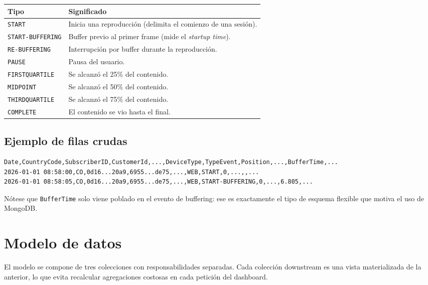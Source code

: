 \documentclass[12pt, letterpaper]{article}
\newcommand{\code}[1]{\texttt{#1}}
\begin{document}
\begin{center}
\begin{tabular}{@{}lL{8.5cm}@{}}
\toprule
\textbf{Tipo} & \textbf{Significado} \\
\midrule
\code{START} & Inicia una reproducción (delimita el comienzo de una sesión). \\
\code{START-BUFFERING} & Buffer previo al primer frame (mide el \emph{startup time}). \\
\code{RE-BUFFERING} & Interrupción por buffer durante la reproducción. \\
\code{PAUSE} & Pausa del usuario. \\
\code{FIRSTQUARTILE} & Se alcanzó el 25\% del contenido. \\
\code{MIDPOINT} & Se alcanzó el 50\% del contenido. \\
\code{THIRDQUARTILE} & Se alcanzó el 75\% del contenido. \\
\code{COMPLETE} & El contenido se vio hasta el final. \\
\bottomrule
\end{tabular}
\end{center}

\subsection{Ejemplo de filas crudas}
\begin{lstlisting}[language=bash,caption={Dos eventos del CSV (cabecera abreviada)}]
Date,CountryCode,SubscriberID,CustomerId,...,DeviceType,TypeEvent,Position,...,BufferTime,...
2026-01-01 08:58:00,CO,0d16...20a9,6955...de75,...,WEB,START,0,...,,...
2026-01-01 08:58:05,CO,0d16...20a9,6955...de75,...,WEB,START-BUFFERING,0,...,6.805,...
\end{lstlisting}

Nótese que \code{BufferTime} solo viene poblado en el evento de buffering: ese es
exactamente el tipo de esquema flexible que motiva el uso de MongoDB.

\section{Modelo de datos}
El modelo se compone de tres colecciones con responsabilidades separadas. Cada
colección downstream es una vista materializada de la anterior, lo que evita
recalcular agregaciones costosas en cada petición del dashboard.
\end{document}
